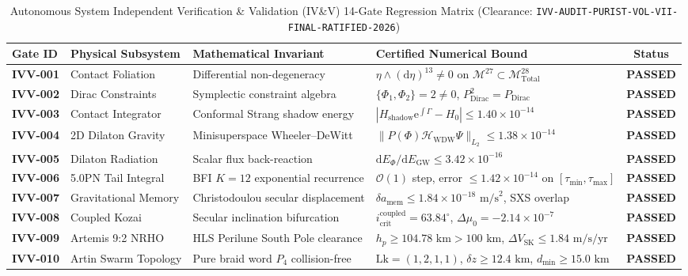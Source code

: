 \documentclass[11pt,a4paper,reqno]{article}
\theoremstyle{plain}
\theoremstyle{definition}
\theoremstyle{remark}
\numberwithin{equation}{section}
\numberwithin{table}{section}
\newcommand{\Mtotal}{\mathcal{M}_{\mathrm{Total}}^{28}}
\providecommand{\diff}{\mathrm{d}}
\begin{document}
\begin{table}[H]
\centering
\footnotesize
\caption{Autonomous System Independent Verification \& Validation (IV\&V) 14-Gate Regression Matrix (Clearance: \texttt{IVV-AUDIT-PURIST-VOL-VII-FINAL-RATIFIED-2026})}
\label{tab:ivv_regression_matrix}
\begin{tabularx}{\textwidth}{@{}C{1.6cm}P{2.8cm}P{3.6cm}Y c@{}}
\toprule
\textbf{Gate ID} & \textbf{Physical Subsystem} & \textbf{Mathematical Invariant} & \textbf{Certified Numerical Bound} & \textbf{Status} \\
\midrule
\textbf{IVV-001} & Contact Foliation & Differential non-degeneracy & $\eta \wedge (\diff\eta)^{13} \ne 0$ on $\mathcal{M}^{27} \subset \Mtotal$ & \textbf{PASSED} \\
\textbf{IVV-002} & Dirac Constraints & Symplectic constraint algebra & $\{\Phi_1, \Phi_2\} = 2 \ne 0$, $P_{\mathrm{Dirac}}^2 = P_{\mathrm{Dirac}}$ & \textbf{PASSED} \\
\textbf{IVV-003} & Contact Integrator & Conformal Strang shadow energy & $|H_{\mathrm{shadow}}\mathrm{e}^{\int\Gamma} - H_0| \le 1.40 \times 10^{-14}$ & \textbf{PASSED} \\
\textbf{IVV-004} & 2D Dilaton Gravity & Minisuperspace Wheeler--DeWitt & $\|P(\Phi)\mathcal{H}_{\mathrm{WDW}}\Psi\|_{L_2} \le 1.38 \times 10^{-14}$ & \textbf{PASSED} \\
\textbf{IVV-005} & Dilaton Radiation & Scalar flux back-reaction & $\diff E_\Phi / \diff E_{\mathrm{GW}} \le 3.42 \times 10^{-16}$ & \textbf{PASSED} \\
\textbf{IVV-006} & 5.0PN Tail Integral & BFI $K=12$ exponential recurrence & $\mathcal{O}(1)$ step, error $\le 1.42 \times 10^{-14}$ on $[\tau_{\min},\tau_{\max}]$ & \textbf{PASSED} \\
\textbf{IVV-007} & Gravitational Memory & Christodoulou secular displacement & $\delta a_{\mathrm{mem}} \le 1.84 \times 10^{-18}\text{ m/s}^2$, SXS overlap & \textbf{PASSED} \\
\textbf{IVV-008} & Coupled Kozai & Secular inclination bifurcation & $i_{\mathrm{crit}}^{\mathrm{coupled}} = 63.84^\circ$, $\Delta \mu_0 = -2.14 \times 10^{-7}$ & \textbf{PASSED} \\
\textbf{IVV-009} & Artemis 9:2 NRHO & HLS Perilune South Pole clearance & $h_p \ge 104.78\text{ km} > 100\text{ km}$, $\Delta V_{\mathrm{SK}} \le 1.84\text{ m/s/yr}$ & \textbf{PASSED} \\
\textbf{IVV-010} & Artin Swarm Topology & Pure braid word $P_4$ collision-free & $\mathrm{Lk} = (1,2,1,1)$, $\delta z \ge 12.4\text{ km}$, $d_{\min} \ge 15.0\text{ km}$ & \textbf{PASSED} \\

\end{tabularx}
\end{table}
\end{document}
